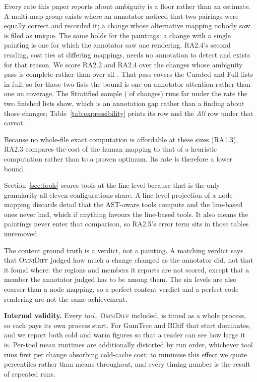 \documentclass[sigconf,review]{acmart}
\begin{document}
Every rate this paper reports about ambiguity is a floor rather than an estimate. A multi-map
group exists where an annotator noticed that two pairings were equally correct and recorded it; a
change whose alternative mapping nobody saw is filed as unique. The same holds for the paintings:
a change with a single painting is one for which the annotator saw one rendering. RA2.4's second
reading, cost ties at differing mappings, needs no annotation to detect and exists for that
reason. We score RA2.2 and RA2.4 over the \AmbiguityListScored{} changes whose ambiguity pass is
complete rather than over all \NumFixtures{}. That pass covers the Curated and Full lists in
full, so for those two lists the bound is one on annotator attention rather than one on coverage.
The Stratified sample (\AmbiguityStratifiedWith{} of \AmbiguityStratifiedTotal{} changes) runs
far under the rate the two finished lists show, which is an annotation gap rather than a finding
about those changes; Table~\ref{tab:expressibility} prints its row and the \emph{All} row under
that caveat.

Because no whole-file exact computation is affordable at these sizes (RA1.3), RA2.3 compares the
cost of the human mapping to that of a heuristic computation rather than to a proven optimum. Its
rate is therefore a lower bound.

Section~\ref{sec:tools} scores tools at the line level because that is the only granularity all
eleven configurations share. A line-level projection of a node mapping discards detail that the
AST-aware tools compute and the line-based ones never had, which if anything favours the
line-based tools. It also means the paintings never enter that comparison, so RA2.5's error term
sits in those tables unremoved.

The content ground truth is a verdict, not a painting. A matching verdict says that
\textsc{OmniDiff} judged how much a change changed as the annotator did, not that it found where:
the regions and members it reports are not scored, except that a member the annotator judged has
to be among them. The six levels are also coarser than a node mapping, so a perfect content
verdict and a perfect code rendering are not the same achievement.

\textbf{Internal validity.} Every tool, \textsc{OmniDiff} included, is timed as a whole process,
so each pays its own process start. For GumTree and BDiff that start dominates, and we report
both cold and warm figures so that a reader can see how large it is. Per-tool mean runtimes are
additionally distorted by run order, whichever tool runs first per change absorbing cold-cache
cost; to minimise this effect we quote percentiles rather than means throughout, and every timing
number is the result of repeated runs.
\end{document}
